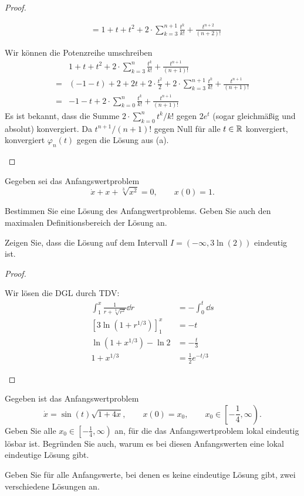 \begin{proof}
\begin{parts}
\begin{align*}
			&=1+t+t^2 + 2\cdot \sum_{k=3}^{n+1}\frac{t^k}{k!}+\frac{t^{n+2}}{(n+2)!}
\end{align*}
\item Wir können die Potenzreihe umschreiben
	\begin{align*}
			&1+t+t^2 + 2\cdot \sum_{k=3}^{n}\frac{t^k}{k!}+\frac{t^{n+1}}{(n+1)!}\\
		=&(-1-t)+2+2t+2\cdot \frac{t^2}{2}+2\cdot \sum_{k=3}^{n+1}\frac{t^k}{k!}+\frac{t^{n+1}}{(n+1)!}\\
		=&-1-t+2\cdot \sum_{k=0}^n \frac{t^k}{k!}+\frac{t^{n+1}}{(n+1)!}
	\end{align*}
	Es ist bekannt, dass die Summe $2\cdot \sum_{k=0}^{n} t^k / k!$ gegen $2e^t$ (sogar gleichmäßig und absolut) konvergiert. Da $t^{n+1} / (n+1)!$ gegen Null f\"{u}r alle $t\in \mathbb{R}$ konvergiert, konvergiert $\varphi_n(t)$ gegen die L\"{o}sung aus (a).\qedhere
	\end{parts}
\end{proof}
\begin{Problem}
	Gegeben sei das Anfangswertproblem
	\[
		\dot{x}+x+\sqrt[3]{x^2} =0,\qquad x(0)=1
	.\] 
	\begin{parts}
	\item Bestimmen Sie eine L\"{o}sung des Anfangwertproblems. Geben Sie auch den maximalen Definitionsbereich der L\"{o}sung an.
	\item Zeigen Sie, dass die L\"{o}sung auf dem Intervall $I=(-\infty, 3\ln (2))$ eindeutig ist.
	\end{parts}
\end{Problem}
\begin{proof}
	\begin{parts}
	\item Wir l\"{o}sen die DGL durch TDV:
		\begin{align*}
			\int_1^x \frac{1}{r+\sqrt[3]{r^2} }\dd{r}&=-\int_0^t \dd{s}\\
			[3\ln (1+r^{1/3})]_1^x &= -t\\
			\ln (1+x^{1/3})-\ln 2 &=-\frac t3\\
			1+x^{1/3}&=\frac 12 e^{-t/3}
		\end{align*}
	\end{parts}
\end{proof}
\begin{Problem}
	Gegeben ist das Anfangswertproblem
	\[
		\dot{x}=\sin(t)\sqrt{1+4x} ,\qquad x(0)=x_0,\qquad x_0\in \left[ -\frac{1}{4}, \infty\right)
	.\] 
	Geben Sie alle $x_0\in \left[-\frac{1}{4},\infty\right)$ an, f\"{u}r die das Anfangswertproblem lokal eindeutig l\"{o}sbar ist. Begr\"{u}nden Sie auch, warum es bei diesen Anfangswerten eine lokal eindeutige L\"{o}sung gibt.

	Geben Sie f\"{u}r alle Anfangswerte, bei denen es keine eindeutige L\"{o}sung gibt, zwei verschiedene L\"{o}sungen an.
\end{Problem}
